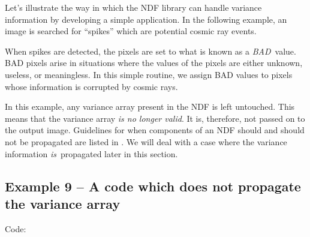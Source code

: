 Let's illustrate the way in which the NDF library can handle variance
information by developing a simple application. In the following example,
an image is searched for ``spikes'' which are potential cosmic ray events.

When spikes are detected, the pixels are set to what is known as a
{\em BAD}\, value. BAD pixels arise in situations where the values of the pixels
are either unknown, useless, or meaningless. In this simple routine, we
assign BAD values to pixels whose information is corrupted by cosmic rays.

In this example, any variance array present in the NDF is left untouched.
This means that the variance array {\em is no longer valid}. It is,
therefore, not passed on to the output image. Guidelines for when
components of an NDF should and should not be propagated are listed in
. We will deal with a case where the variance
information {\em is}\, propagated later in this section.

\subsection{Example 9 -- A code which does not propagate the variance array}

Code:

